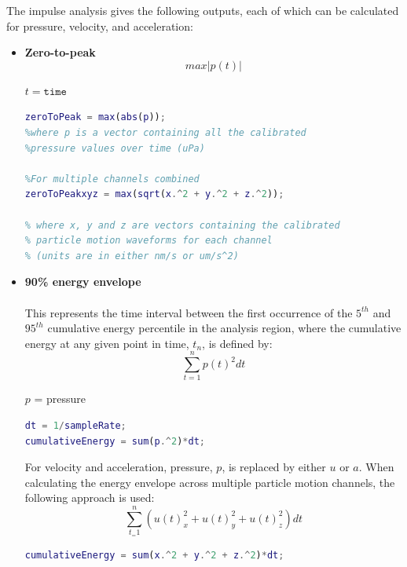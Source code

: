 \documentclass[11pt]{report}
\begin{document}
The impulse analysis gives the following outputs, each of which can be calculated for pressure, velocity, and acceleration:\\
\begin{itemize}
\item \textbf{Zero-to-peak}
$$\mathit{max}|\mathit{p(t)}|$$
\begin{flushright}
$t = \mathtt{time}$
\end{flushright}

\begin{lstlisting}[style=github, language=MATLAB]
zeroToPeak = max(abs(p));
%where p is a vector containing all the calibrated
%pressure values over time (uPa)

%For multiple channels combined
zeroToPeakxyz = max(sqrt(x.^2 + y.^2 + z.^2));

% where x, y and z are vectors containing the calibrated
% particle motion waveforms for each channel
% (units are in either nm/s or um/s^2)

\end{lstlisting}


\item \textbf{90\% energy envelope}\\\\
This represents the time interval between the first occurrence of the $5^{th}$ and $95^{th}$ cumulative energy percentile in the analysis region, where the cumulative energy at any given point in time, $t_n$, is defined by:\\
$$\sum_{t = 1}^{n}p(t)^2 dt$$
\begin{flushright}
$p$ = pressure
\end{flushright}

\begin{lstlisting}[style=github, language=MATLAB]
dt = 1/sampleRate;
cumulativeEnergy = sum(p.^2)*dt;
\end{lstlisting}


For velocity and acceleration, pressure, $p$, is replaced by either $u$ or $a$.  When calculating the energy envelope across multiple particle motion channels, the following approach is used:\\

$$\sum_{t_ = 1}^{n} \left( u(t)_x^2 + u(t)_y^2 + u(t)_z^2 \right) dt$$

\begin{lstlisting}[style=github, language=MATLAB]
cumulativeEnergy = sum(x.^2 + y.^2 + z.^2)*dt;
\end{lstlisting}


\end{itemize}
\end{document}
